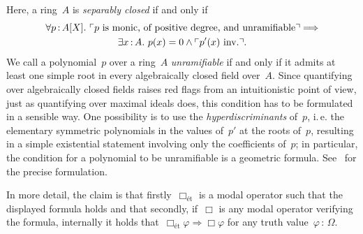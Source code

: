 \documentclass[10pt,reqno,a4paper]{amsbook}
\makeatletter
\theoremstyle{definition}
\theoremstyle{plain}
\theoremstyle{remark}
\newcommand{\?}{\,{:}\,}
\renewcommand{\_}{\mathpunct{.}\,}
\newcommand{\speak}[1]{\ulcorner\text{\textnormal{#1}}\urcorner}
\newcommand{\ie}{i.\,e.\@\xspace}
\newcommand{\inv}{inv.\@}
\makeatother
\begin{document}
Here, a ring~$A$ is \emph{separably closed} if and only if
\begin{multline*}
  \forall p\?A[X]\_ \speak{$p$ is monic, of positive degree, and unramifiable}
  \Longrightarrow \\
  \exists x\?A\_ p(x) = 0 \wedge \speak{$p'(x)$ \inv}.
\end{multline*}
We call a polynomial~$p$ over a ring~$A$ \emph{unramifiable} if and
only if it admits at least one simple root in every algebraically closed field
over~$A$. Since quantifying over algebraically closed fields raises red flags
from an intuitionistic point of view, just as quantifying over maximal ideals
does, this condition has to be formulated in a sensible way. One possibility is
to use the \emph{hyperdiscriminants} of~$p$, \ie the elementary symmetric
polynomials in the values of~$p'$ at the roots of~$p$, resulting in a simple
existential statement involving only the coefficients of~$p$; in particular,
the condition for a polynomial to be unramifiable is a geometric formula.
See~\cite[p.~751]{wraith:generic-galois-theory} for the precise formulation.

In more detail, the claim is that firstly~$\Box_\text{ét}$ is a modal operator
such that the displayed formula holds and that secondly, if~$\Box$ is any modal
operator verifying the formula, internally it holds that~$\Box_\text{ét}\varphi
\Rightarrow \Box\varphi$ for any truth value~$\varphi\?\Omega$.
\end{document}

